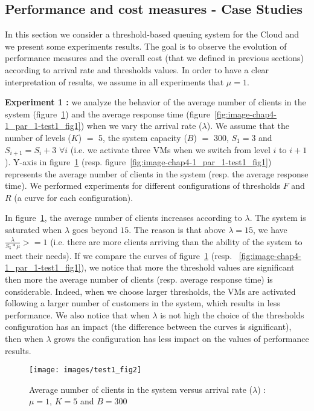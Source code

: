 \documentclass[conference]{IEEEtran}
\begin{document}
\subsection{Performance and cost measures - Case Studies}
\label{BBB}
In this section we consider a threshold-based queuing system for the Cloud and we present some experiments results. The goal is to observe the evolution of performance measures and the overall cost (that we defined in previous sections) according to arrival rate and thresholds values. In order to have a clear interpretation of results, we assume in all experiments that $\mu=1$. 

\textbf{Experiment 1 :} we analyze the behavior of the average number of clients in the system (figure~\ref{fig:image-chap4-1_par_1-test1_fig2}) and the average response time (figure~\ref{fig:image-chap4-1_par_1-test1_fig1}) when we vary the arrival rate ($\lambda$). We assume that the number of levels ($K$) $=$ 5, the system capacity ($B$) $=$ 300, $S_{1}=3$ and $S_{i+1}=S_{i}+3$ $\forall i$ (i.e. we activate three VMs when we switch from level $i$ to $i+1$). Y-axis in figure~\ref{fig:image-chap4-1_par_1-test1_fig2} (resp. figure~\ref{fig:image-chap4-1_par_1-test1_fig1}) represents the average number of clients in the system (resp. the average response time). We performed experiments for different configurations of thresholds $F$ and $R$ (a curve for each configuration). 

In figure~\ref{fig:image-chap4-1_par_1-test1_fig2}, the average number of clients increases according to $\lambda$. The system is saturated when $\lambda$ goes beyond $15$. The reason is that above $\lambda=15$, we have $\frac{\lambda}  {S_{5}*\mu} >= 1$ (i.e. there are more clients arriving than the ability of the system to meet their needs). If we compare the curves of figure~\ref{fig:image-chap4-1_par_1-test1_fig2} (resp. ~\ref{fig:image-chap4-1_par_1-test1_fig1}), we notice that more the threshold values are significant then more the average number of clients (resp. average response time) is considerable. Indeed, when we choose larger thresholds, the VMs are activated following a larger number of customers in the system, which results in less performance. We also notice that when $\lambda$ is not high the choice of the thresholds configuration has an impact (the difference between the curves is significant), then when $\lambda$ grows the configuration has less impact on the values of performance results.

\begin{figure}[!t]
\centering
\texttt{[image: images/test1\_fig2]}
\caption{Average number of clients in the system versus arrival rate ($\lambda$) : $\mu=1$, $K=5$ and $B=300$}
\label{fig:image-chap4-1_par_1-test1_fig2}
\end{figure}
\end{document}
